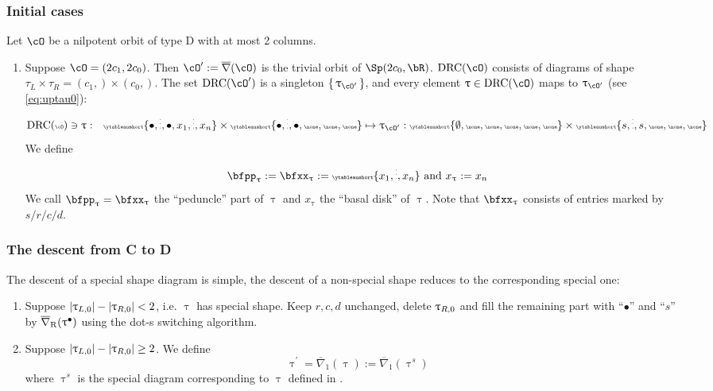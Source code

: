 \documentclass[12pt,a4paper]{amsart}
\def\abs#1{\left|{#1}\right|}
\def\eDD{\overline{\nabla}}
\def\eDDo{\overline{\nabla}_1}
\numberwithin{equation}{section}
\theoremstyle{remark}
\def\drc{\mathrm{DRC}}
\let\ytb=\ytableaushort
\newcommand{\tytb}[1]{{\tiny\ytb{#1}}}
\def\cOp{\cO^{\prime}}
\def\uptaup{\uptau^{\prime}}
\begin{document}
\subsubsection{Initial cases}
Let $\cO$ be a nilpotent orbit of type D with at most 2 columns.
\begin{enumerate}[resume*=alg1]
  \item Suppose $\cO = (2c_{1},2c_{0})$.
        Then
        $\cOp:=\eDD(\cO)$ is the trivial orbit of $\Sp(2c_{0},\bR)$. $\drc(\cO)$
        consists of diagrams of shape
        $\tau_{L}\times \tau_{R} =(c_{1},)\times (c_{0},)$.
        The set $\drc(\cOp)$ is a singleton $\set{\uptau_{\cOp}}$, and every element
        $\uptau \in \drc(\cO)$ maps to $\uptau_{\cOp}$ (see \eqref{eq:uptau0}):
        \[\tiny
          \drc(\cO)\ni \uptau: \hspace{1em} \ytb{\bullet,\vdots,\bullet,{x_{1}},\vdots,{x_{n}}}
          \times \ytb{\bullet,\vdots,\bullet,\none,\none,\none}
          \mapsto \uptau_{\cOp}:
          \ytb{\emptyset,\none,\none,\none,\none,\none}
          \times \ytb{s,\vdots,s,\none,\none,\none}
        \]
        We define
        \[
          \bfpp_{\uptau}:=\bfxx_{\uptau} := \tytb{{x_{1}},\vdots,{x_{n}}} \text{ and }x_{\uptau}:=x_{n}
        \]
        We call $\bfpp_{\uptau}=\bfxx_{\uptau}$ the ``peduncle'' part of $\uptau$ and
        $x_{\uptau}$ the
        ``basal disk'' of $\uptau$.
        Note that $\bfxx_{\uptau}$ consists of entries marked by $s/r/c/d$.
\end{enumerate}


\subsubsection{The descent from C to D}
The descent of a special shape diagram is simple, the descent of a non-special shape
reduces to the corresponding special one:
\begin{enumerate}[resume*=alg1]
  \item Suppose $\abs{\taulf} - \abs{\taurf} < 2$, i.e. $\uptau$ has special
        shape. Keep $r,c,d$ unchanged, delete $\uptau_{R,0}$ and fill the remaining
        part with ``$\bullet$'' and ``$s$'' by $\DDr(\uptau^{\bullet})$ using
        the dot-s switching algorithm.
  \item Suppose $\abs{\taulf} - \abs{\taurf} \geq 2$. We define
        \[\uptaup=\eDDo(\uptau):=\eDDo(\uptau^{s})\] where $\uptau^{s}$ is the
        special diagram corresponding to $\uptau$ defined in
        .
\end{enumerate}
\end{document}

